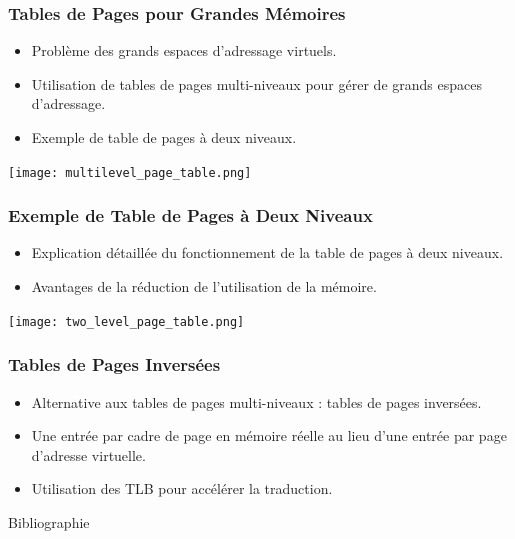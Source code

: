 \documentclass{beamer}
\begin{document}
\begin{frame}
\frametitle{Tables de Pages pour Grandes Mémoires}
\begin{itemize}
    \item Problème des grands espaces d'adressage virtuels.
    \item Utilisation de tables de pages multi-niveaux pour gérer de grands espaces d'adressage.
    \item Exemple de table de pages à deux niveaux.
\end{itemize}
\texttt{[image: multilevel\_page\_table.png]}
\end{frame}

\begin{frame}
\frametitle{Exemple de Table de Pages à Deux Niveaux}
\begin{itemize}
    \item Explication détaillée du fonctionnement de la table de pages à deux niveaux.
    \item Avantages de la réduction de l'utilisation de la mémoire.
\end{itemize}
\texttt{[image: two\_level\_page\_table.png]}
\end{frame}

\begin{frame}
\frametitle{Tables de Pages Inversées}
\begin{itemize}
    \item Alternative aux tables de pages multi-niveaux : tables de pages inversées.
    \item Une entrée par cadre de page en mémoire réelle au lieu d'une entrée par page d'adresse virtuelle.
    \item Utilisation des TLB pour accélérer la traduction.
\end{itemize}
\end{frame}


\begin{frame}{Bibliographie}

    
\end{frame}
\end{document}
